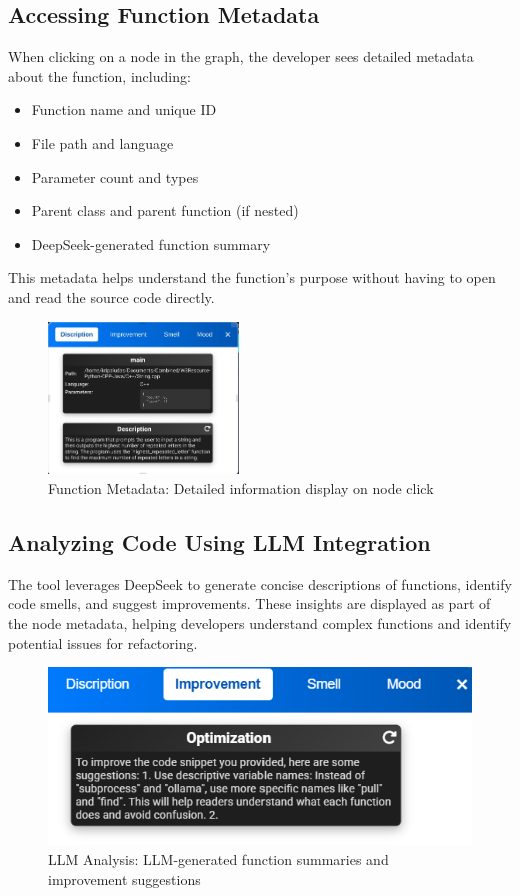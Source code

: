 \documentclass[10pt,twocolumn]{article}
\begin{document}
\subsection{Accessing Function Metadata}

When clicking on a node in the graph, the developer sees detailed metadata about the function, including:
\begin{itemize}
    \item Function name and unique ID
    \item File path and language
    \item Parameter count and types
    \item Parent class and parent function (if nested)
    \item DeepSeek-generated function summary
\end{itemize}

This metadata helps understand the function's purpose without having to open and read the source code directly.

\begin{figure}[h]
    \centering
    \includegraphics[width=0.45\textwidth]{img4.jpeg}
    \caption{Function Metadata: Detailed information display on node click}
\end{figure}

\subsection{Analyzing Code Using LLM Integration}

The tool leverages DeepSeek to generate concise descriptions of functions, identify code smells, and suggest improvements. These insights are displayed as part of the node metadata, helping developers understand complex functions and identify potential issues for refactoring.

\begin{figure}
    \centering
    \includegraphics[width=1\linewidth]{img5.png}
    \caption{LLM Analysis: LLM-generated function summaries and improvement suggestions}
    \label{fig:enter-label}
\end{figure}
\end{document}
